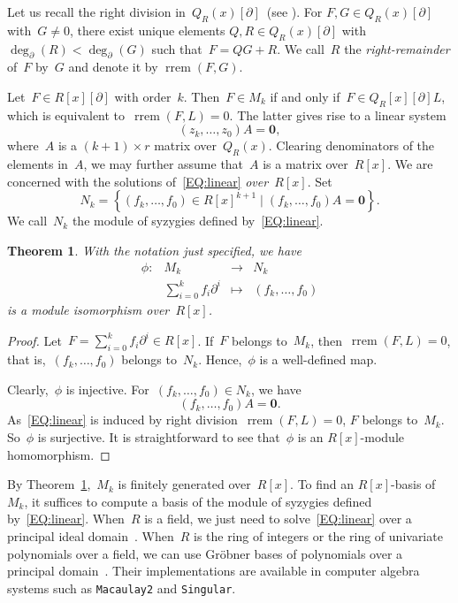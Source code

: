 \documentclass{sig-alternate}
\newcommand{\rrem}{\operatorname{rrem}}
\newcommand{\pa}{\partial}
\newtheorem{theorem}{Theorem}[section]
\begin{document}
Let us recall the right division in~$Q_{R}(x)[\pa]$~(see \cite[Section 3]{Bronstein1996}). For
$F, G \in Q_{R}(x)[\pa]$ with~$G \neq 0$, there exist unique elements $Q, R \in Q_{R}(x)[\pa]$ with~$\deg_{\pa}(R) < \deg_{\pa}(G)$ such that~$F = Q G + R$. We call~$R$ the \emph{right-remainder} of~$F$ by~$G$ and denote it by $\rrem(F, G)$.

Let~$F \in R[x][\pa]$ with order~$k$.
Then~$F \in M_k$ if and only if~$F \in Q_R[x][\pa] L$,
which is equivalent to~$\rrem(F, L)=0$. The latter gives rise to a linear system
\begin{equation} \label{EQ:linear}
(z_k,  \ldots, z_0) A  = \mathbf{0},
\end{equation}
where~$A$ is a $(k+1) \times r$ matrix over~$Q_R(x)$. Clearing denominators of the elements in~$A$, we may further assume
that~$A$ is a matrix over~$R[x]$. We are concerned with the solutions of~\eqref{EQ:linear} {\em over~$R[x]$}. Set
\[  N_k = \left\{(f_k,  \ldots, f_0) \in R[x]^{k+1} \mid (f_k,  \ldots, f_0) A = \mathbf{0} \right\}. \]
We call~$N_k$ the module of syzygies defined by~\eqref{EQ:linear}.
\begin{theorem} \label{TH:iso}
With the notation just specified, we have
\[
\begin{array}{cccc}
\phi: &  M_k & \longrightarrow & N_k \\
      &   \sum_{i=0}^k f_i \pa^i & \mapsto & (f_k, \ldots, f_0)
\end{array}
\]
is a module isomorphism over~$R[x]$.
\end{theorem}
\begin{proof}
Let~$F = \sum_{i=0}^k f_i \pa^i \in R[x]$.
If~$F$ belongs to~$M_k$, then~$\rrem(F, L)=0$, that is,~$(f_k, \ldots, f_0)$ belongs to~$N_k$.
Hence,~$\phi$ is a well-defined map.

Clearly,~$\phi$ is injective. For~$(f_k, \ldots, f_0) \in N_k$,
we have
$$(f_k, \ldots, f_0) A = \mathbf{0}.$$ As~\eqref{EQ:linear} is induced by right division~$\rrem\left( F, L \right)=0$,
$F$ belongs to~$M_k$. So~$\phi$ is surjective. It is straightforward to see that~$\phi$ is an $R[x]$-module homomorphism.
\end{proof}

By Theorem~\ref{TH:iso},~$M_k$ is finitely generated over~$R[x]$. To find an $R[x]$-basis of~$M_k$, it suffices to compute a basis of the module of syzygies defined by~\eqref{EQ:linear}.
When~$R$ is a field, we just need to solve~\eqref{EQ:linear} over a principal ideal domain~\cite[Chapter 5]{Arne2013}. When~$R$ is the ring of integers
or the ring of univariate polynomials over a field, we can use Gr\"obner bases of polynomials over a principal domain~\cite{Kapur1988, David182}. Their implementations are available in computer algebra systems such as {\tt Macaulay2} and {\tt Singular}.
\end{document}
